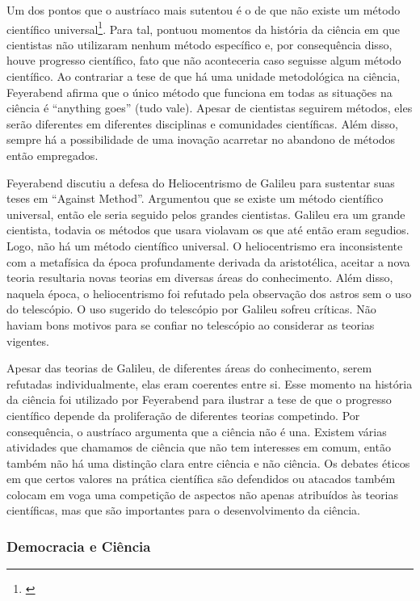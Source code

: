 \documentclass[12pt]{report}
\begin{document}
			Um dos pontos que o austríaco mais sutentou é o de que não existe um método científico universal\footnote{\cite{feyerabend-against-method}}. Para tal, pontuou momentos da história da ciência em que cientistas não utilizaram nenhum método específico e, por consequência disso, houve progresso científico, fato que não aconteceria caso seguisse algum método científico. Ao contrariar a tese de que há uma unidade metodológica na ciência, Feyerabend afirma que o único método que funciona em todas as situações na ciência é ``anything goes'' (tudo vale). Apesar de cientistas seguirem métodos, eles serão diferentes em diferentes disciplinas e comunidades científicas. Além disso, sempre há a possibilidade de uma inovação acarretar no abandono de métodos então empregados.
			
			Feyerabend discutiu a defesa do Heliocentrismo de Galileu para sustentar suas teses em ``Against Method''.
			Argumentou que se existe um método científico universal, então ele seria seguido pelos grandes cientistas. Galileu era um grande cientista, todavia os métodos que usara violavam os que até então eram segudios. Logo, não há um método científico universal. O heliocentrismo era inconsistente com a metafísica da época profundamente derivada da aristotélica, aceitar a nova teoria resultaria novas teorias em diversas áreas do conhecimento. Além disso, naquela época, o heliocentrismo foi refutado pela observação dos astros sem o uso do telescópio. O uso sugerido do telescópio por Galileu sofreu críticas. Não haviam bons motivos para se confiar no telescópio ao considerar as teorias vigentes.
			
			Apesar das teorias de Galileu, de diferentes áreas do conhecimento, serem refutadas individualmente, elas eram coerentes entre si. Esse momento na história da ciência foi utilizado por Feyerabend para ilustrar a tese de que o progresso científico depende da proliferação de diferentes teorias competindo. Por consequência, o austríaco argumenta que a ciência não é una. Existem várias atividades que chamamos de ciência que não tem interesses em comum, então também não há uma distinção clara entre ciência e não ciência. Os debates éticos em que certos valores na prática científica são defendidos ou atacados também colocam em voga uma competição de aspectos não apenas atribuídos às teorias científicas, mas que são importantes para o desenvolvimento da ciência.
			
		\subsubsection{Democracia e Ciência}
		
\end{document}
